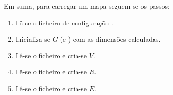 \documentclass[relatorio.tex]{subfiles}
\begin{document}
Em suma, para carregar um mapa seguem-se os passos:

\begin{enumerate}
\item  Lê-se o ficheiro de configuração .
\item Inicializa-se $G$ (e )
com as dimensões calculadas.
\item Lê-se o ficheiro  e cria-se $V$.
\item Lê-se o ficheiro  e cria-se $R$.
\item Lê-se o ficheiro  e cria-se $E$.
\end{enumerate}
\end{document}
